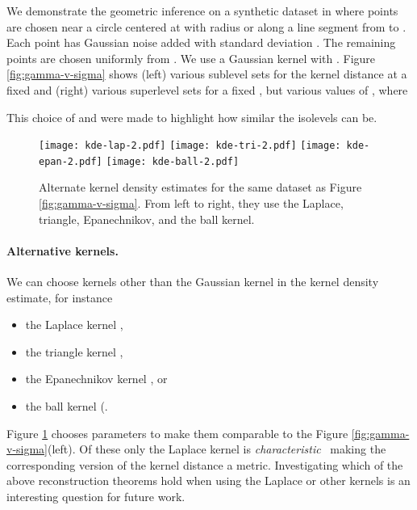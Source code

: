 \documentclass[11pt]{myclass}
\begin{document}
We demonstrate the geometric inference on a synthetic dataset in  where  points are chosen near a circle centered at  with radius  or along a line segment from  to .  Each point has Gaussian noise added with standard deviation .  The remaining  points are chosen uniformly from .  
We use a Gaussian kernel with .  
Figure \ref{fig:gamma-v-sigma} shows 
(left) various sublevel sets  for the kernel distance at a fixed  and (right) various superlevel sets for a fixed , but various values of , where



\noindent
This choice of  and  were made to highlight how similar the isolevels can be.  



\begin{figure}
\texttt{[image: kde-lap-2.pdf]}
\hspace{0.3mm}
\texttt{[image: kde-tri-2.pdf]}
\hspace{0.3mm}
\texttt{[image: kde-epan-2.pdf]}
\hspace{0.3mm}
\texttt{[image: kde-ball-2.pdf]}

\caption{\label{fig:TEB}  
\small \sffamily
Alternate kernel density estimates for the same dataset as Figure \ref{fig:gamma-v-sigma}.  From left to right, they use the Laplace, triangle, Epanechnikov, and the ball kernel.}
\end{figure}



\paragraph{Alternative kernels.}
We can choose kernels other than the Gaussian kernel in the kernel density estimate, for instance 
\begin{itemize} \denselist
\item the Laplace kernel , 
\item the triangle kernel , 
\item the Epanechnikov kernel , or 
\item the ball kernel (.   
\end{itemize}
Figure \ref{fig:TEB} chooses parameters to make them comparable to the Figure \ref{fig:gamma-v-sigma}(left).  
Of these only the Laplace kernel is \emph{characteristic}~\cite{SGFSL10} making the corresponding version of the kernel distance a metric.  Investigating which of the above reconstruction theorems hold when using the Laplace or other kernels is an interesting question for future work.  
\end{document}
